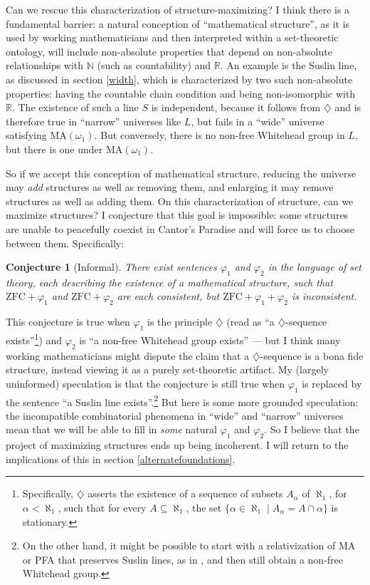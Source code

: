 \documentclass[letterpaper,12pt]{article}
\newcommand{\N}{\mathbb{N}}
\newcommand{\R}{\mathbb{R}}
\newcommand{\ZFC}{\mathrm{ZFC}}
\renewcommand{\phi}{\varphi}
\newtheorem{conjecture}{Conjecture}
\begin{document}
Can we rescue this characterization of structure-maximizing? I think there is a fundamental barrier: a natural conception of ``mathematical structure'', as it is used by working mathematicians and then interpreted within a set-theoretic ontology, will include non-absolute properties that depend on non-absolute relationships with $\N$ (such as countability) and $\R$. An example is the Suslin line, as discussed in section \ref{width}, which is characterized by two such non-absolute properties: having the countable chain condition and being non-isomorphic with $\R$. The existence of such a line $S$ is independent, because it follows from $\diamondsuit$ and is therefore true in ``narrow'' universes like $L$, but fails in a ``wide'' universe satisfying $\mathrm{MA}(\omega_1)$. But conversely, there is no non-free Whitehead group in $L$, but there is one under $\mathrm{MA}(\omega_1)$.

So if we accept this conception of mathematical structure, reducing the universe may \emph{add} structures as well as removing them, and enlarging it may remove structures as well as adding them. On this characterization of structure, can we maximize structures? I conjecture that this goal is impossible: some structures are unable to peacefully coexist in Cantor's Paradise and will force us to choose between them. Specifically:

\begin{conjecture}[Informal]
There exist sentences $\phi_1$ and $\phi_2$ in the language of set theory, each describing the existence of a mathematical structure, such that $\ZFC + \phi_1$ and $\ZFC + \phi_2$ are each consistent, but $\ZFC + \phi_1 + \phi_2$ is inconsistent.
\end{conjecture}

This conjecture is true when $\phi_1$ is the principle $\diamondsuit$ (read as ``a $\diamondsuit$-sequence exists''\footnote{Specifically, $\diamondsuit$ asserts the existence of a sequence of subsets $A_\alpha$ of $\aleph_1$, for $\alpha < \aleph_1$, such that for every $A \subseteq \aleph_1$, the set $\{\alpha \in \aleph_1 \mid A_\alpha = A \cap \alpha\}$ is stationary.}) and $\phi_2$ is ``a non-free Whitehead group exists'' --- but I think many working mathematicians might dispute the claim that a $\diamondsuit$-sequence is a bona fide structure, instead viewing it as a purely set-theoretic artifact. My (largely uninformed) speculation is that the conjecture is still true when $\phi_1$ is replaced by the sentence ``a Suslin line exists''.\footnote{On the other hand, it might be possible to start with a relativization of MA or PFA that preserves Suslin lines, as in \cite{todorcevic2011forcing}, and then still obtain a non-free Whitehead group.} But here is some more grounded speculation: the incompatible combinatorial phenomena in ``wide'' and ``narrow'' universes mean that we will be able to fill in \emph{some} natural $\phi_1$ and $\phi_2$. So I believe that the project of maximizing structures ends up being incoherent. I will return to the implications of this in section \ref{alternatefoundations}.
\end{document}
